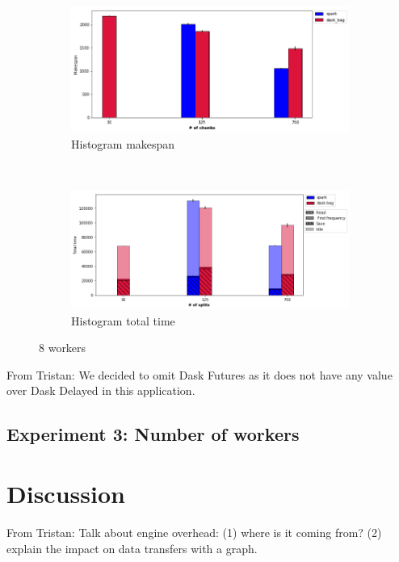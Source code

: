 \documentclass[conference]{IEEEtran}
\newcommand{\TG}[1]{\color{cyan}From Tristan: #1 \color{black}}
\begin{document}
\begin{figure}[!t]
    \centering
    \begin{subfigure}[b]{\columnwidth}
        \includegraphics[clip,width=\columnwidth]{images/histo_splits.png}%
        \caption{Histogram makespan}\label{fig:histo_ms_block}
    \end{subfigure}
    \\
    \begin{subfigure}[b]{\columnwidth}
        \includegraphics[clip,width=\columnwidth]{images/histo_idle_splits.png}%
        \caption{Histogram total time}\label{fig:histo_tt_block}
    \end{subfigure}
    \caption{8 workers}
\end{figure}
\TG{We decided to omit Dask Futures as it does not have any value over Dask
Delayed in this application.}
\subsection{Experiment 3: Number of workers}



\section{Discussion}

\TG{Talk about engine overhead: (1) where is it coming from? (2) 
explain the impact on data transfers with a graph.}
\end{document}
